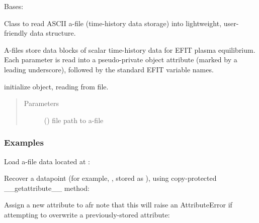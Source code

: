 \documentclass[letterpaper,10pt,english]{sphinxmanual}
\begin{document}
\begin{fulllineitems}
\label{\detokenize{eqtools:eqtools.afilereader.AFileReader}}
Bases: 

Class to read ASCII a-file (time-history data storage) into lightweight,
user-friendly data structure.

A-files store data blocks of scalar time-history data for EFIT
plasma equilibrium.  Each parameter is read into a pseudo-private object
attribute (marked by a leading underscore), followed by the standard
EFIT variable names.

initialize object, reading from file.
\begin{quote}\begin{description}
\item[{Parameters}] \leavevmode
{} () \textendash{} file path to a-file

\end{description}\end{quote}
\subsubsection*{Examples}

Load a-file data located at :

\begin{sphinxVerbatim}[commandchars=\\\{\}]
  
\end{sphinxVerbatim}

Recover a datapoint (for example, , stored as ),
using copy-protected \_\_getattribute\_\_ method:

\begin{sphinxVerbatim}[commandchars=\\\{\}]
  
\end{sphinxVerbatim}

Assign a new attribute to afr \textendash{} note that this will raise an
AttributeError if attempting to overwrite a previously-stored
attribute:

\begin{sphinxVerbatim}[commandchars=\\\{\}]
  
\end{sphinxVerbatim}

\end{fulllineitems}
\end{document}
